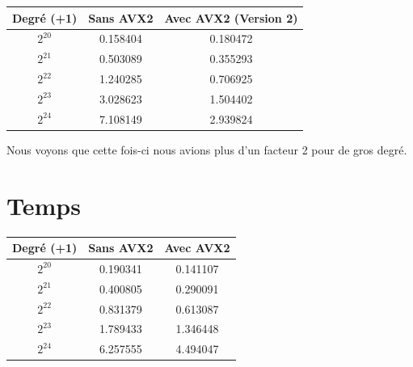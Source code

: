 \documentclass[12pt, a4paper]{article}
\begin{document}
\begin{center}
\begin{tabular}{||c c c||}
\hline
Degré (+1) & Sans AVX2 & Avec AVX2 (Version 2) \\
\hline\hline
$2^{20}$ & 0.158404 & 0.180472 \\
\hline
$2^{21}$ & 0.503089 & 0.355293 \\
\hline
$2^{22}$ & 1.240285 & 0.706925 \\
\hline
$2^{23}$ & 3.028623 & 1.504402 \\
\hline
$2^{24}$ & 7.108149 & 2.939824 \\
\hline
\end{tabular}
\end{center}

Nous voyons que cette fois-ci nous avions plus d'un facteur 2 pour de gros degré.

\section{Temps}

\begin{center}
\begin{tabular}{||c c c||}
\hline
Degré (+1) & Sans AVX2 & Avec AVX2 \\
\hline\hline
$2^{20}$ & 0.190341 & 0.141107 \\
\hline
$2^{21}$ & 0.400805 & 0.290091 \\
\hline
$2^{22}$ & 0.831379 & 0.613087 \\
\hline
$2^{23}$ & 1.789433 & 1.346448 \\
\hline
$2^{24}$ & 6.257555 & 4.494047 \\
\hline
\end{tabular}
\end{center}

\newpage



\end{document}
